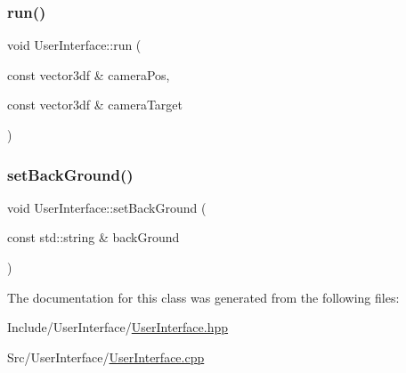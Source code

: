 \subsubsection{\texorpdfstring{run()}{run()}}
{\footnotesize\ttfamily void User\+Interface\+::run (\begin{DoxyParamCaption}\item[{const vector3df \&}]{camera\+Pos,  }\item[{const vector3df \&}]{camera\+Target }\end{DoxyParamCaption})}

\mbox{\label{class_user_interface_a7d7a15f22c081ea83232514bcd6e0714}} 
\subsubsection{\texorpdfstring{setBackGround()}{setBackGround()}}
{\footnotesize\ttfamily void User\+Interface\+::set\+Back\+Ground (\begin{DoxyParamCaption}\item[{const std\+::string \&}]{back\+Ground }\end{DoxyParamCaption})}



The documentation for this class was generated from the following files\+:\begin{DoxyCompactItemize}
\item 
Include/\+User\+Interface/\mbox{\hyperlink{_user_interface_8hpp}{User\+Interface.\+hpp}}\item 
Src/\+User\+Interface/\mbox{\hyperlink{_user_interface_8cpp}{User\+Interface.\+cpp}}\end{DoxyCompactItemize}
